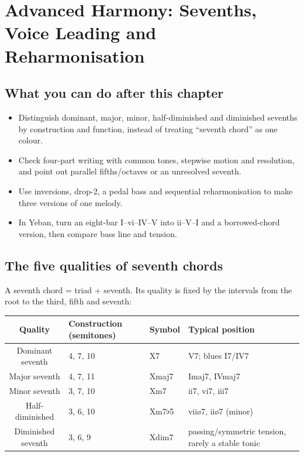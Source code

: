 \clearpage
\chapter{Advanced Harmony: Sevenths, Voice Leading and Reharmonisation}
\label{chap:advanced-harmony}


\section*{What you can do after this chapter}
\begin{itemize}
  \item Distinguish dominant, major, minor, half-diminished and diminished sevenths by construction and function, instead of treating ``seventh chord'' as one colour.
  \item Check four-part writing with common tones, stepwise motion and resolution, and point out parallel fifths/octaves or an unresolved seventh.
  \item Use inversions, drop-2, a pedal bass and sequential reharmonisation to make three versions of one melody.
  \item In Yeban, turn an eight-bar I--vi--IV--V into ii--V--I and a borrowed-chord version, then compare bass line and tension.
\end{itemize}

\section{The five qualities of seventh chords}

A seventh chord = triad + seventh. Its quality is fixed by the intervals from the root to the third, fifth and seventh:

\begin{center}
\small
\begin{tabular}{clll}
\toprule
Quality & Construction (semitones) & Symbol & Typical position \\
\midrule
Dominant seventh & 4, 7, 10 & X7 & V7; blues I7/IV7 \\
Major seventh & 4, 7, 11 & Xmaj7 & Imaj7, IVmaj7 \\
Minor seventh & 3, 7, 10 & Xm7 & ii7, vi7, iii7 \\
Half-diminished & 3, 6, 10 & Xm7\(\flat\)5 & viiø7, iiø7 (minor) \\
Diminished seventh & 3, 6, 9 & Xdim7 & passing/symmetric tension, rarely a stable tonic \\
\bottomrule
\end{tabular}
\end{center}

